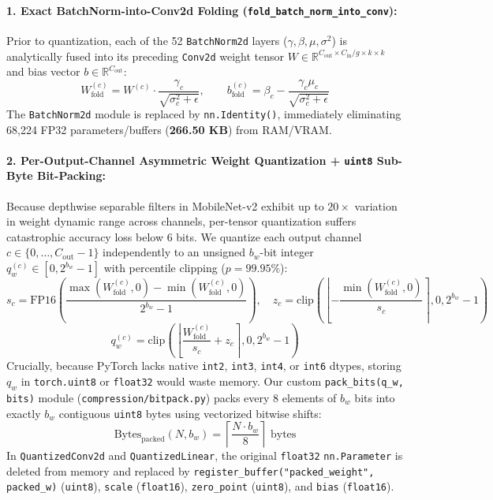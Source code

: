 \documentclass[11pt,a4paper]{article}
\begin{document}
\paragraph{1. Exact BatchNorm-into-Conv2d Folding (\texttt{fold\_batch\_norm\_into\_conv}):}
Prior to quantization, each of the 52 \texttt{BatchNorm2d} layers ($\gamma, \beta, \mu, \sigma^2$) is analytically fused into its preceding \texttt{Conv2d} weight tensor $W \in \mathbb{R}^{C_{\text{out}}\times C_{\text{in}}/g \times k \times k}$ and bias vector $b \in \mathbb{R}^{C_{\text{out}}}$:
\[
W_{\text{fold}}^{(c)} = W^{(c)} \cdot \frac{\gamma_c}{\sqrt{\sigma_c^2 + \epsilon}}, \qquad b_{\text{fold}}^{(c)} = \beta_c - \frac{\gamma_c \mu_c}{\sqrt{\sigma_c^2 + \epsilon}}
\]
The \texttt{BatchNorm2d} module is replaced by \texttt{nn.Identity()}, immediately eliminating 68,224 FP32 parameters/buffers (\textbf{266.50 KB}) from RAM/VRAM.

\paragraph{2. Per-Output-Channel Asymmetric Weight Quantization + \texttt{uint8} Sub-Byte Bit-Packing:}
Because depthwise separable filters in MobileNet-v2 exhibit up to $20\times$ variation in weight dynamic range across channels, per-tensor quantization suffers catastrophic accuracy loss below 6 bits. We quantize each output channel $c \in \{0, \dots, C_{\text{out}}-1\}$ independently to an unsigned $b_w$-bit integer $q_w^{(c)} \in [0, 2^{b_w}-1]$ with percentile clipping ($p = 99.95\%$):
\[
s_c = \text{FP16}\!\left(\frac{\max(W_{\text{fold}}^{(c)}, 0) - \min(W_{\text{fold}}^{(c)}, 0)}{2^{b_w} - 1}\right), \quad z_c = \text{clip}\!\left(\left\lfloor -\frac{\min(W_{\text{fold}}^{(c)}, 0)}{s_c} \right\rceil, 0, 2^{b_w}-1\right)
\]
\[
q_w^{(c)} = \text{clip}\!\left(\left\lfloor \frac{W_{\text{fold}}^{(c)}}{s_c} + z_c \right\rceil, 0, 2^{b_w}-1\right)
\]
Crucially, because PyTorch lacks native \texttt{int2}, \texttt{int3}, \texttt{int4}, or \texttt{int6} dtypes, storing $q_w$ in \texttt{torch.uint8} or \texttt{float32} would waste memory. Our custom \texttt{pack\_bits(q\_w, bits)} module (\texttt{compression/bitpack.py}) packs every 8 elements of $b_w$ bits into exactly $b_w$ contiguous \texttt{uint8} bytes using vectorized bitwise shifts:
\[
\text{Bytes}_{\text{packed}}(N, b_w) = \left\lceil \frac{N \cdot b_w}{8} \right\rceil \text{ bytes}
\]
In \texttt{QuantizedConv2d} and \texttt{QuantizedLinear}, the original \texttt{float32} \texttt{nn.Parameter} is deleted from memory and replaced by \texttt{register\_buffer("packed\_weight", packed\_w)} (\texttt{uint8}), \texttt{scale} (\texttt{float16}), \texttt{zero\_point} (\texttt{uint8}), and \texttt{bias} (\texttt{float16}).
\end{document}
